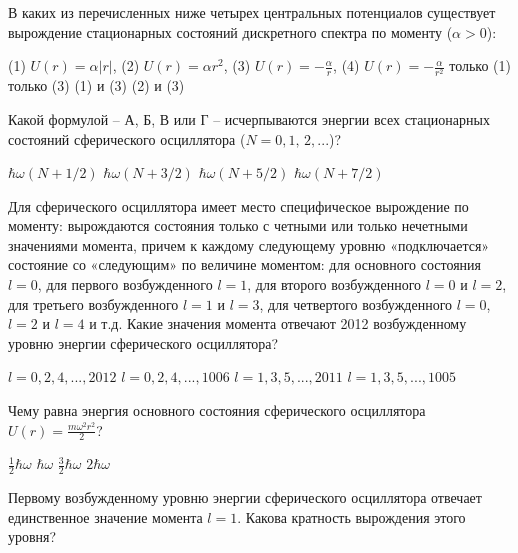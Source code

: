 \documentclass[11pt,a4paper]{exam}
\begin{document}
\begin{questions}

\question В каких из перечисленных ниже четырех центральных потенциалов существует вырождение стационарных состояний дискретного спектра по моменту ($\alpha  > 0$): 
\begin{choices}
(1) $U(r) = \alpha |r|$, (2) $U(r) = \alpha {r^2}$, (3) $U(r) =  - \frac{\alpha }{r}$, (4) $U(r) =  - \frac{\alpha }{{{r^2}}}$
\choice только (1)     
\choice только (3)     
\choice (1) и (3)      
\choice (2) и (3)
\end{choices}

\question Какой формулой – А, Б, В или Г – исчерпываются энергии всех стационарных состояний сферического осциллятора ($N = 0,1,\,2,...$)?
\begin{choices}
\choice $\hbar \omega \left( {N + 1/2} \right)$   
\choice $\hbar \omega \left( {N + 3/2} \right)$   
\choice $\hbar \omega \left( {N + 5/2} \right)$   
\choice $\hbar \omega \left( {N + 7/2} \right)$
\end{choices}

\question Для сферического осциллятора имеет место специфическое вырождение по моменту: вырождаются состояния только с четными или только нечетными значениями момента, причем к каждому следующему уровню «подключается» состояние со «следующим» по величине моментом: для основного состояния $l = 0$, для первого возбужденного $l = 1$, для второго возбужденного $l = 0$ и $l = 2$, для третьего возбужденного  $l = 1$ и $l = 3$, для четвертого возбужденного $l = 0$, $l = 2$ и $l = 4$ и т.д. Какие значения момента отвечают 2012 возбужденному уровню энергии сферического осциллятора?
\begin{choices}
\choice $l = 0,2,4,...,2012$    
\choice $l = 0,2,4,...,1006$ 
\choice $l = 1,3,5,...,2011$    
\choice $l = 1,3,5,...,1005$
\end{choices}

\question Чему равна энергия основного состояния сферического осциллятора $U(r) = \frac{{m{\omega ^2}{r^2}}}{2}$?
\begin{choices}
\choice $\frac{1}{2}\hbar \omega $    
\choice $\hbar \omega $      
\choice $\frac{3}{2}\hbar \omega $    
\choice $2\hbar \omega $
\end{choices}

\question Первому возбужденному уровню энергии сферического осциллятора отвечает единственное значение момента $l = 1$. Какова кратность вырождения этого уровня?
\begin{choices}
\end{choices}


\end{questions}
\end{document}
